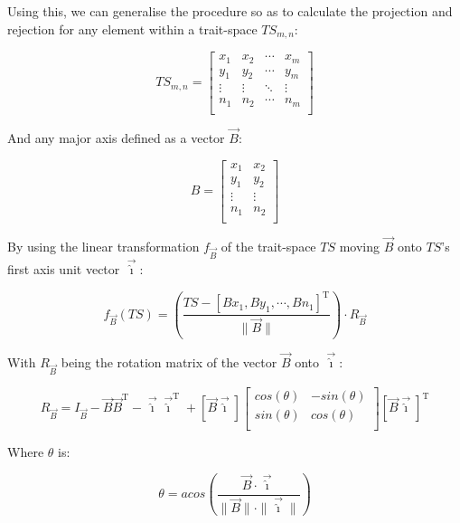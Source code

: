 \documentclass[12pt,letterpaper]{article}
\begin{document}
Using this, we can generalise the procedure so as to calculate the projection and rejection for any element within a trait-space $TS_{m,n}$:

\begin{equation}
    TS_{m,n} = 
    \begin{bmatrix}
    x_{1} & x_{2} & \cdots & x_{m} \\
    y_{1} & y_{2} & \cdots & y_{m} \\
    \vdots  & \vdots  & \ddots & \vdots \\
    n_{1} & n_{2} & \cdots & n_{m} \\
    \end{bmatrix}
\end{equation}

And any major axis defined as a vector $\vec{B}$:

\begin{equation}
    B = 
    \begin{bmatrix}
    x_{1} & x_{2}\\
    y_{1} & y_{2}\\
    \vdots  & \vdots  \\
    n_{1} & n_{2} \\
    \end{bmatrix}
\end{equation}

By using the linear transformation $f_{\vec{B}}$ of the trait-space $TS$ moving $\vec{B}$ onto $TS$'s first axis unit vector $\vec{\hat{\imath}}$:

$$f_{\vec{B}}(TS) = \left( \frac{TS - [Bx_{1}, By_{1}, \cdots, Bn_{1}]^{\text{T}}}{\|\vec{B}\|} \right) \cdot R_{\vec{B}}$$

With $R_{\vec{B}}$ being the rotation matrix of the vector $\vec{B}$ onto $\vec{\hat{\imath}}$:

\begin{equation}
R_{\vec{B}} = I_{\vec{B}} - \vec{B}\vec{B}^\text{T} - \vec{\hat{\imath}}\vec{\hat{\imath}}^\text{T} + [\vec{B} \vec{\hat{\imath}}]
    \begin{bmatrix}
        cos(\theta) & -sin(\theta)\\
        sin(\theta) & cos(\theta)\\
    \end{bmatrix} [\vec{B} \vec{\hat{\imath}}]^\text{T}
\end{equation}

Where $\theta$ is:

\begin{equation}
    \theta = acos \left(\frac{\vec{B} \cdot \vec{\hat{\imath}}}{\|\vec{B}\| \cdot \|\vec{\hat{\imath}}\|} \right)
\end{equation}
\end{document}
